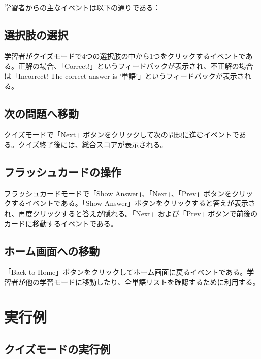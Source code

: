 \documentclass[]{jsarticle}
\begin{document}
学習者からの主なイベントは以下の通りである：

\subsection{選択肢の選択}
学習者がクイズモードで4つの選択肢の中から1つをクリックするイベントである。正解の場合、「Correct!」というフィードバックが表示され、不正解の場合は「Incorrect! The correct answer is '単語'」というフィードバックが表示される。

\subsection{次の問題へ移動}
クイズモードで「Next」ボタンをクリックして次の問題に進むイベントである。クイズ終了後には、総合スコアが表示される。

\subsection{フラッシュカードの操作}
フラッシュカードモードで「Show Answer」、「Next」、「Prev」ボタンをクリックするイベントである。「Show Answer」ボタンをクリックすると答えが表示され、再度クリックすると答えが隠れる。「Next」および「Prev」ボタンで前後のカードに移動するイベントである。

\subsection{ホーム画面への移動}
「Back to Home」ボタンをクリックしてホーム画面に戻るイベントである。学習者が他の学習モードに移動したり、全単語リストを確認するために利用する。

\newpage
\section{実行例}
\subsection{クイズモードの実行例}
\end{document}
